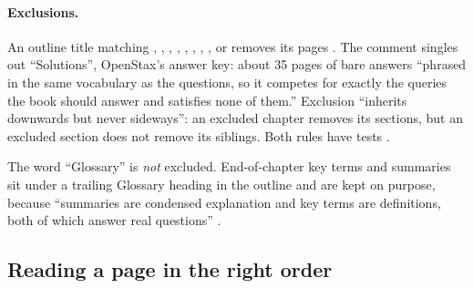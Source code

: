 \paragraph{Exclusions.} An outline title matching , , , , , , , ,  or  removes its pages . The comment singles out \enquote{Solutions}, OpenStax's answer key: about 35 pages of bare answers \enquote{phrased in the same vocabulary as the questions, so it competes for exactly the queries the book should answer and satisfies none of them.} Exclusion \enquote{inherits downwards but never sideways}: an excluded chapter removes its sections, but an excluded section does not remove its siblings. Both rules have tests .

The word \enquote{Glossary} is \emph{not} excluded. End-of-chapter key terms and summaries sit under a trailing Glossary heading in the outline and are kept on purpose, because \enquote{summaries are condensed explanation and key terms are definitions, both of which answer real questions} .

\subsection{Reading a page in the right order}

